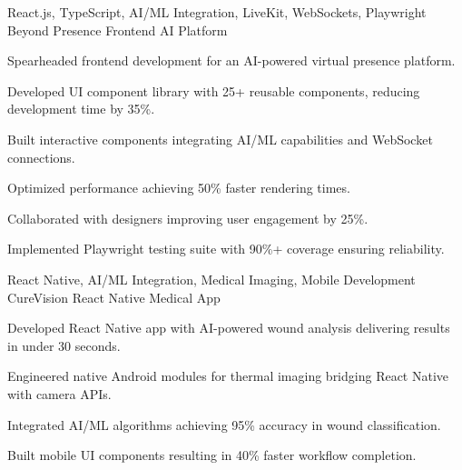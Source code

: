 \begin{cventries}
  \cventry
    {React.js, TypeScript, AI/ML Integration, LiveKit, WebSockets, Playwright} %
    {Beyond Presence} %
    {Frontend AI Platform} %
    {}
    {
      \begin{cvitems} %
        \item {Spearheaded frontend development for an AI-powered virtual presence platform.}
        \item {Developed UI component library with 25+ reusable components, reducing development time by 35\%.}
        \item {Built interactive components integrating AI/ML capabilities and WebSocket connections.}
        \item {Optimized performance achieving 50\% faster rendering times.}
        \item {Collaborated with designers improving user engagement by 25\%.}
        \item {Implemented Playwright testing suite with 90\%+ coverage ensuring reliability.}
      \end{cvitems}
    }


  \cventry
    {React Native, AI/ML Integration, Medical Imaging, Mobile Development} %
    {CureVision} %
    {React Native Medical App} %
    {} %
    {
      \begin{cvitems} %
        \item {Developed React Native app with AI-powered wound analysis delivering results in under 30 seconds.}
        \item {Engineered native Android modules for thermal imaging bridging React Native with camera APIs.}
        \item {Integrated AI/ML algorithms achieving 95\% accuracy in wound classification.}
        \item {Built mobile UI components resulting in 40\% faster workflow completion.}
      \end{cvitems}
    }

\end{cventries} 